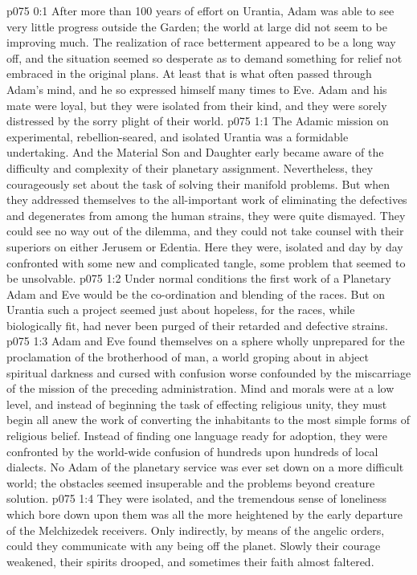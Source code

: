\author{Solonia}
\vs p075 0:1 After more than 100 years of effort on Urantia, Adam was able to see very little progress outside the Garden; the world at large did not seem to be improving much. The realization of race betterment appeared to be a long way off, and the situation seemed so desperate as to demand something for relief not embraced in the original plans. At least that is what often passed through Adam’s mind, and he so expressed himself many times to Eve. Adam and his mate were loyal, but they were isolated from their kind, and they were sorely distressed by the sorry plight of their world.
\vs p075 1:1 The Adamic mission on experimental, rebellion\hyp{}seared, and isolated Urantia was a formidable undertaking. And the Material Son and Daughter early became aware of the difficulty and complexity of their planetary assignment. Nevertheless, they courageously set about the task of solving their manifold problems. But when they addressed themselves to the all\hyp{}important work of eliminating the defectives and degenerates from among the human strains, they were quite dismayed. They could see no way out of the dilemma, and they could not take counsel with their superiors on either Jerusem or Edentia. Here they were, isolated and day by day confronted with some new and complicated tangle, some problem that seemed to be unsolvable.
\vs p075 1:2 Under normal conditions the first work of a Planetary Adam and Eve would be the co\hyp{}ordination and blending of the races. But on Urantia such a project seemed just about hopeless, for the races, while biologically fit, had never been purged of their retarded and defective strains.
\vs p075 1:3 Adam and Eve found themselves on a sphere wholly unprepared for the proclamation of the brotherhood of man, a world groping about in abject spiritual darkness and cursed with confusion worse confounded by the miscarriage of the mission of the preceding administration. Mind and morals were at a low level, and instead of beginning the task of effecting religious unity, they must begin all anew the work of converting the inhabitants to the most simple forms of religious belief. Instead of finding one language ready for adoption, they were confronted by the world\hyp{}wide confusion of hundreds upon hundreds of local dialects. No Adam of the planetary service was ever set down on a more difficult world; the obstacles seemed insuperable and the problems beyond creature solution.
\vs p075 1:4 They were isolated, and the tremendous sense of loneliness which bore down upon them was all the more heightened by the early departure of the Melchizedek receivers. Only indirectly, by means of the angelic orders, could they communicate with any being off the planet. Slowly their courage weakened, their spirits drooped, and sometimes their faith almost faltered.
